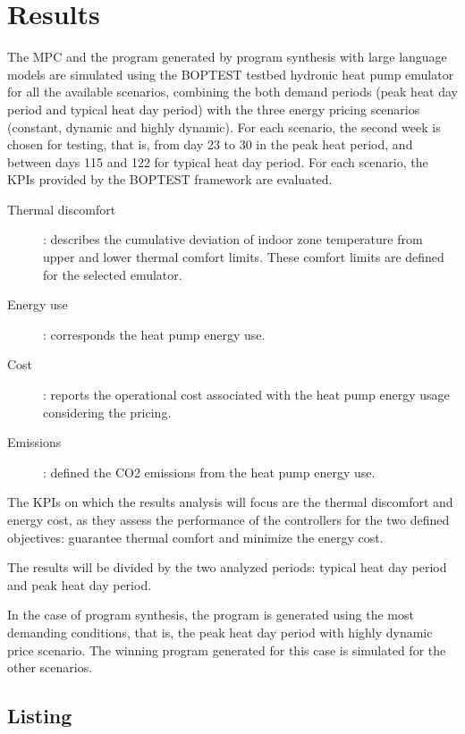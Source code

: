 \newpage
\section{Results}
\label{sec:boptest-results}

The MPC and the program generated by program synthesis with large language models are simulated using the BOPTEST testbed hydronic heat pump emulator for all the available scenarios, combining the both demand periods (peak heat day period and typical heat day period) with the three energy pricing scenarios (constant, dynamic and highly dynamic). For each scenario, the second week is chosen for testing, that is, from day 23 to 30 in the peak heat period, and between days 115 and 122 for typical heat day period.
For each scenario, the KPIs provided by the BOPTEST framework are evaluated.
 \begin{description}
     \item[Thermal discomfort]: describes the cumulative deviation of indoor zone temperature from upper and lower thermal comfort limits. These comfort limits are defined for the selected emulator.
     \item[Energy use]: corresponds the heat pump energy use.
     \item[Cost]: reports the operational cost associated with the heat pump energy usage considering the pricing.
     \item[Emissions]: defined the CO2 emissions from the heat pump energy use.
 \end{description}
The KPIs on which the results analysis will focus are the thermal discomfort and energy cost, as they assess the performance of the controllers for the two defined objectives: guarantee thermal comfort and minimize the energy cost.

The results will be divided by the two analyzed periods: typical heat day period and peak heat day period.

In the case of program synthesis, the program is generated using the most demanding conditions, that is, the peak heat day period with highly dynamic price scenario. The winning program generated for this case is simulated for the other scenarios.


\newpage
\subsection{Listing}

